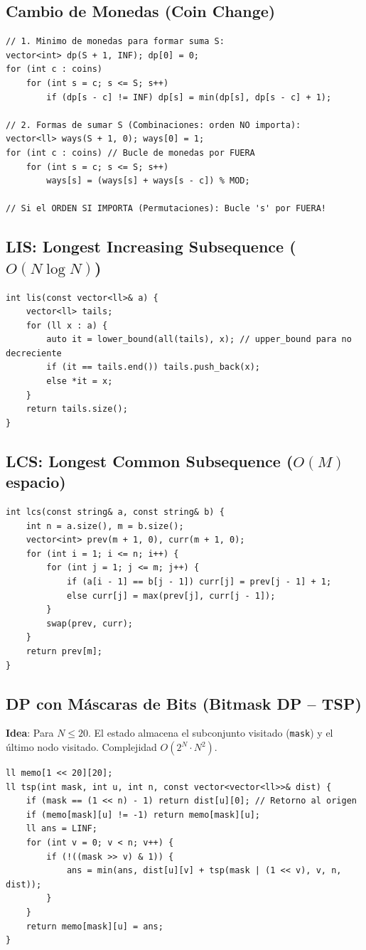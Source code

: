 \documentclass[9pt,twocolumn,a4paper]{extarticle}
\begin{document}
\subsection{Cambio de Monedas (Coin Change)}
\begin{lstlisting}
// 1. Minimo de monedas para formar suma S:
vector<int> dp(S + 1, INF); dp[0] = 0;
for (int c : coins)
    for (int s = c; s <= S; s++)
        if (dp[s - c] != INF) dp[s] = min(dp[s], dp[s - c] + 1);

// 2. Formas de sumar S (Combinaciones: orden NO importa):
vector<ll> ways(S + 1, 0); ways[0] = 1;
for (int c : coins) // Bucle de monedas por FUERA
    for (int s = c; s <= S; s++)
        ways[s] = (ways[s] + ways[s - c]) % MOD;

// Si el ORDEN SI IMPORTA (Permutaciones): Bucle 's' por FUERA!
\end{lstlisting}

\subsection{LIS: Longest Increasing Subsequence ($O(N \log N)$)}
\begin{lstlisting}
int lis(const vector<ll>& a) {
    vector<ll> tails;
    for (ll x : a) {
        auto it = lower_bound(all(tails), x); // upper_bound para no decreciente
        if (it == tails.end()) tails.push_back(x);
        else *it = x;
    }
    return tails.size();
}
\end{lstlisting}

\subsection{LCS: Longest Common Subsequence ($O(M)$ espacio)}
\begin{lstlisting}
int lcs(const string& a, const string& b) {
    int n = a.size(), m = b.size();
    vector<int> prev(m + 1, 0), curr(m + 1, 0);
    for (int i = 1; i <= n; i++) {
        for (int j = 1; j <= m; j++) {
            if (a[i - 1] == b[j - 1]) curr[j] = prev[j - 1] + 1;
            else curr[j] = max(prev[j], curr[j - 1]);
        }
        swap(prev, curr);
    }
    return prev[m];
}
\end{lstlisting}

\subsection{DP con Máscaras de Bits (Bitmask DP -- TSP)}
\textbf{Idea}: Para $N \le 20$. El estado almacena el subconjunto visitado (\texttt{mask}) y el último nodo visitado. Complejidad $O(2^N \cdot N^2)$.
\begin{lstlisting}
ll memo[1 << 20][20];
ll tsp(int mask, int u, int n, const vector<vector<ll>>& dist) {
    if (mask == (1 << n) - 1) return dist[u][0]; // Retorno al origen
    if (memo[mask][u] != -1) return memo[mask][u];
    ll ans = LINF;
    for (int v = 0; v < n; v++) {
        if (!((mask >> v) & 1)) {
            ans = min(ans, dist[u][v] + tsp(mask | (1 << v), v, n, dist));
        }
    }
    return memo[mask][u] = ans;
}
\end{lstlisting}
\end{document}
